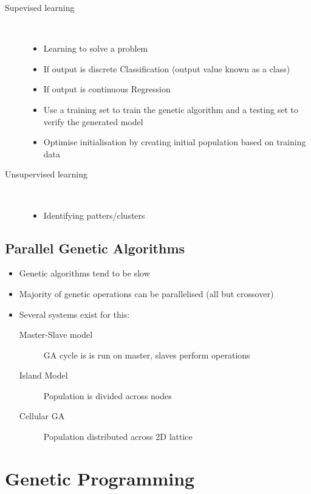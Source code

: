 \documentclass[a4paper]{article}
\begin{document}
\begin{description}
  \item[Supevised learning] \hfill \\
    \begin{itemize}
      \item Learning to solve a problem
      \item If output is discrete \RArrow Classification (output value known as
            a class)
      \item If output is continuous \RArrow Regression
      \item Use a training set to train the genetic algorithm and a testing set
            to verify the generated model
      \item Optimise initialisation by creating initial population based on
            training data
    \end{itemize}

  \item[Unsupervised learning] \hfill \\
    \begin{itemize}
      \item Identifying patters/clusters
    \end{itemize}

\end{description}

\subsection{Parallel Genetic Algorithms}

\begin{itemize}
  \item Genetic algorithms tend to be slow
  \item Majority of genetic operations can be parallelised (all but crossover)
  \item Several systems exist for this:
    \begin{description}
      \item[Master-Slave model]
        GA cycle is is run on master, slaves perform operations
      \item[Island Model]
        Population is divided across nodes
      \item[Cellular GA]
        Population distributed across 2D lattice
    \end{description}
\end{itemize}

\section{Genetic Programming}
\label{sec:gp}
\end{document}
